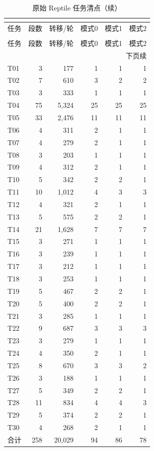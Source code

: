 \begingroup\small
\begin{longtable}{lrrrrr}
\caption{原始全部合格 Reptile 任务；每个任务在四个epoch中各访问一次。模式列是任务内方向排序规则确定的段数，不是逐模式转移频数或最终混合概率。}\label{tab:reptile-task-accounting}\hypertarget{tab:reptile-task-accounting}{}\\
\toprule
任务 & 段数 & 转移/轮 & 模式0 & 模式1 & 模式2\\
\midrule
\endfirsthead
\caption[]{原始 Reptile 任务清点（续）}\\
\toprule
任务 & 段数 & 转移/轮 & 模式0 & 模式1 & 模式2\\
\midrule
\endhead
\midrule
\multicolumn{6}{r}{下页续}\\
\endfoot
\bottomrule
\endlastfoot
T01 & 3 & 177 & 1 & 1 & 1\\
T02 & 7 & 610 & 3 & 2 & 2\\
T03 & 3 & 333 & 1 & 1 & 1\\
T04 & 75 & 5,324 & 25 & 25 & 25\\
T05 & 33 & 2,476 & 11 & 11 & 11\\
T06 & 4 & 311 & 2 & 1 & 1\\
T07 & 4 & 279 & 2 & 1 & 1\\
T08 & 3 & 203 & 1 & 1 & 1\\
T09 & 4 & 312 & 2 & 1 & 1\\
T10 & 5 & 342 & 2 & 2 & 1\\
T11 & 10 & 1,012 & 4 & 3 & 3\\
T12 & 4 & 321 & 2 & 1 & 1\\
T13 & 5 & 575 & 2 & 2 & 1\\
T14 & 21 & 1,628 & 7 & 7 & 7\\
T15 & 3 & 271 & 1 & 1 & 1\\
T16 & 3 & 239 & 1 & 1 & 1\\
T17 & 3 & 212 & 1 & 1 & 1\\
T18 & 3 & 253 & 1 & 1 & 1\\
T19 & 5 & 467 & 2 & 2 & 1\\
T20 & 5 & 400 & 2 & 2 & 1\\
T21 & 3 & 285 & 1 & 1 & 1\\
T22 & 9 & 687 & 3 & 3 & 3\\
T23 & 3 & 279 & 1 & 1 & 1\\
T24 & 4 & 350 & 2 & 1 & 1\\
T25 & 8 & 670 & 3 & 3 & 2\\
T26 & 3 & 188 & 1 & 1 & 1\\
T27 & 5 & 349 & 2 & 2 & 1\\
T28 & 11 & 834 & 4 & 4 & 3\\
T29 & 5 & 374 & 2 & 2 & 1\\
T30 & 4 & 268 & 2 & 1 & 1\\
合计 & 258 & 20,029 & 94 & 86 & 78\\
\end{longtable}
\endgroup

